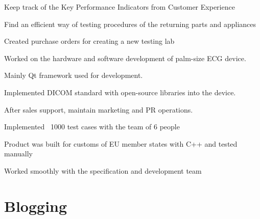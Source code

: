 \documentclass[]{deedy-resume-openfont}
\begin{document}
\begin{minipage}[t]{0.66\textwidth}
\href{http://www.bsh-group.com.tr/}{}
\begin{tightemize}
\item Keep track of the Key Performance Indicators from Customer Experience
\item Find an efficient way of testing procedures of the returning parts and appliances 
\item Created purchase orders for creating a new testing lab
\end{tightemize}
\sectionsep

\href{http://infron.com.tr/}{}
\begin{tightemize}
\item Worked on the hardware and software development of palm-size ECG device.
\item Mainly Qt framework used for development.
\item Implemented DICOM standard with open-source libraries into the device.
\item After sales support, maintain marketing and PR operations.
\end{tightemize}
\sectionsep

\href{http://www.accenture.com/lv-en/}{}
\begin{tightemize}
\item Implemented ~1000 test cases with the team of 6 people \\
\item Product was built for customs of EU member states with C++ and tested manually \\
\item Worked smoothly with the specification and development team \\

\end{tightemize}
\sectionsep


\section{Blogging}
\href{http://metoinside.com/}{}


\end{minipage}
\end{document}
